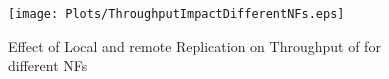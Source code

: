 \begin{figure}[t]
\begin{center}
\texttt{[image: Plots/ThroughputImpactDifferentNFs.eps]}
\caption{Effect of Local and remote Replication on Throughput of \name for different NFs}
\label{fig:ThroughputImpactDifferentNFs}
\end{center}
\end{figure}